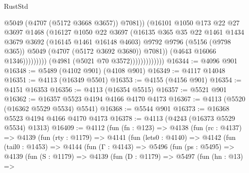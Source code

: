 \begin{lexlean}{RustStd}
\begin{coremodule}
                                            @5049
                                            (@4707 (@5172 @3668 @3657))
                                            @7081))
                                        (@16101
                                          @1050
                                          @173
                                          @22
                                          @27
                                          @3697
                                          @1468
                                          (@16127
                                            @1050
                                            @22
                                            @3697
                                            (@16135
                                              @365
                                              @35
                                              @22
                                              @1461
                                              @1434
                                              @3679
                                              @3692
                                              (@16145 @1461 @16148 @4603)
                                              @9792
                                              @9796
                                              (@5156 (@9798 @365))
                                              @5049
                                              (@4707 (@5172 @3692 @3680))
                                              @7081))
                                          (@4643 @16066 @1346)))))))))
                          (@4981 (@5021 @70 @3572)))))))))))))
@16344 := @4096 @901
@16348 := @5489 (@4102 @901) (@4108 @901)
@16349 := @4117 @14048
@16351 := @4113 (@16349 @5501)
@16353 := @4155 (@4156 @901)
@16354 := @4151 @16353
@16356 := @4113 (@16354 @5515)
@16357 := @5521 @901
@16362 := @16357 @5523 @4194 @4166 @4170 @4173
@16367 := @4113 (@5520 (@16362 @5529 @5534) @5541)
@16368 := @5544 @901
@16373 := @16368 @5523 @4194 @4166 @4170 @4173
@16378 := @4113 (@4243 (@16373 @5529 @5534) @1313)
@16409 := @4112
    (fun (fn : @123) =>
    @4138
      (fun (rc : @4137) =>
      @4139
        (fun (rty : @1179) =>
        @4141
          (fun (lets0 : @4140) =>
          @4142
            (fun (tail0 : @1453) =>
            @4144
              (fun (Γ : @4143) =>
              @5496
                (fun (ps : @5495) =>
                @4139
                  (fun (S : @1179) =>
                  @4139
                    (fun (D : @1179) =>
                    @5497
                      (fun (hn : @13) =>

\end{coremodule}
\end{lexlean}
